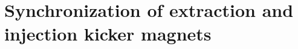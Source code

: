 %
%
%
%
%

%
%

\section{Synchronization of extraction and injection kicker magnets}
\label{sec:kicker}

